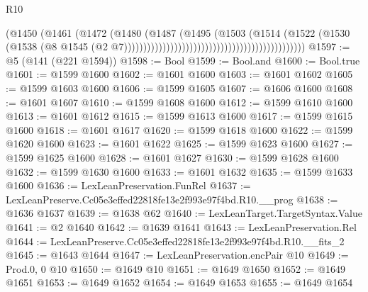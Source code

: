 \begin{lexlean}{R10}
\begin{coremodule}
                                                                        (@1450
                                                                          (@1461
                                                                            (@1472
                                                                              (@1480
                                                                                (@1487
                                                                                  (@1495
                                                                                    (@1503
                                                                                      (@1514
                                                                                        (@1522
                                                                                          (@1530
                                                                                            (@1538
                                                                                              (@8
                                                                                                @1545
                                                                                                (@2
                                                                                                  @7)))))))))))))))))))))))))))))))))))))))))))))))
@1597 := @5 (@141 (@221 @1594))
@1598 := Bool
@1599 := Bool.and
@1600 := Bool.true
@1601 := @1599 @1600
@1602 := @1601 @1600
@1603 := @1601 @1602
@1605 := @1599 @1603 @1600
@1606 := @1599 @1605
@1607 := @1606 @1600
@1608 := @1601 @1607
@1610 := @1599 @1608 @1600
@1612 := @1599 @1610 @1600
@1613 := @1601 @1612
@1615 := @1599 @1613 @1600
@1617 := @1599 @1615 @1600
@1618 := @1601 @1617
@1620 := @1599 @1618 @1600
@1622 := @1599 @1620 @1600
@1623 := @1601 @1622
@1625 := @1599 @1623 @1600
@1627 := @1599 @1625 @1600
@1628 := @1601 @1627
@1630 := @1599 @1628 @1600
@1632 := @1599 @1630 @1600
@1633 := @1601 @1632
@1635 := @1599 @1633 @1600
@1636 := LexLeanPreservation.FunRel
@1637 := LexLeanPreserve.Cc05e3effed22818fe13e2f993e97f4bd.R10.__prog
@1638 := @1636 @1637
@1639 := @1638 @62
@1640 := LexLeanTarget.TargetSyntax.Value
@1641 := @2 @1640
@1642 := @1639 @1641
@1643 := LexLeanPreservation.Rel
@1644 := LexLeanPreserve.Cc05e3effed22818fe13e2f993e97f4bd.R10.__fits_2
@1645 := @1643 @1644
@1647 := LexLeanPreservation.encPair @10
@1649 := Prod.{0, 0} @10
@1650 := @1649 @10
@1651 := @1649 @1650
@1652 := @1649 @1651
@1653 := @1649 @1652
@1654 := @1649 @1653
@1655 := @1649 @1654

\end{coremodule}
\end{lexlean}
